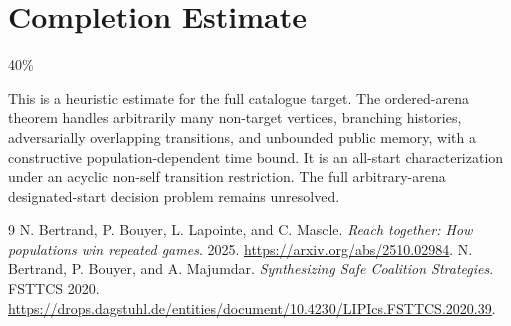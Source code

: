 \documentclass[11pt]{article}
\theoremstyle{definition}
\theoremstyle{remark}
\begin{document}
\section{Completion Estimate}
40\%

This is a heuristic estimate for the full catalogue target.
The ordered-arena theorem handles arbitrarily many non-target vertices,
branching histories, adversarially overlapping transitions, and unbounded
public memory, with a constructive population-dependent time bound. It is
an all-start characterization under an acyclic non-self transition
restriction. The full arbitrary-arena designated-start decision problem
remains unresolved.

\begin{thebibliography}{9}
 N. Bertrand, P. Bouyer, L. Lapointe, and C. Mascle.
\emph{Reach together: How populations win repeated games}. 2025.
\url{https://arxiv.org/abs/2510.02984}.
 N. Bertrand, P. Bouyer, and A. Majumdar.
\emph{Synthesizing Safe Coalition Strategies}. FSTTCS 2020.
\url{https://drops.dagstuhl.de/entities/document/10.4230/LIPIcs.FSTTCS.2020.39}.
\end{thebibliography}
\end{document}
